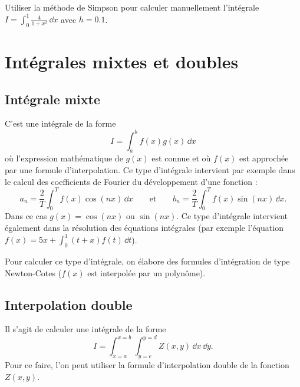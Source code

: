 \begin{exercice}[Exercice 7]
Utiliser la méthode de Simpson pour calculer manuellement l'intégrale
$I = \displaystyle\int_0^1 \frac{4}{1+x^2}\,\dd x$ avec $h = 0.1$.
\end{exercice}

\section{Intégrales mixtes et doubles}

\subsection{Intégrale mixte}

C'est une intégrale de la forme
\[
  I = \int_a^b f(x)g(x)\,\dd x
\]
où l'expression mathématique de $g(x)$ est connue et où $f(x)$ est approchée
par une formule d'interpolation. Ce type d'intégrale intervient par exemple
dans le calcul des coefficients de Fourier du développement d'une fonction :
\[
  a_n = \frac{2}{T}\int_0^T f(x)\cos(nx)\,\dd x
  \qquad\text{et}\qquad
  b_n = \frac{2}{T}\int_0^T f(x)\sin(nx)\,\dd x .
\]
Dans ce cas $g(x) = \cos(nx)$ ou $\sin(nx)$. Ce type d'intégrale intervient
également dans la résolution des équations intégrales (par exemple
l'équation $f(x) = 5x + \int_0^1 (t + x)f(t)\,\dd t$).

Pour calculer ce type d'intégrale, on élabore des formules d'intégration de
type Newton-Cotes ($f(x)$ est interpolée par un polynôme).

\subsection{Interpolation double}

Il s'agit de calculer une intégrale de la forme
\[
  I = \int_{x=a}^{x=b}\int_{y=c}^{y=d} Z(x,y)\,\dd x\,\dd y .
\]
Pour ce faire, l'on peut utiliser la formule d'interpolation double de la
fonction $Z(x,y)$.

